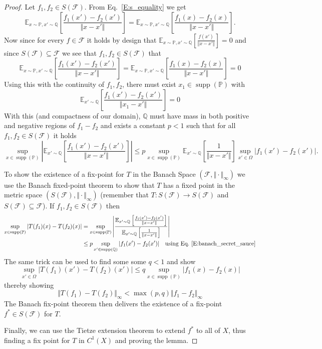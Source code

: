 \documentclass{article}
\DeclareMathOperator{\supp}{supp}
\begin{document}
\begin{proof}
  Let $f_1,f_2\in S(\mathcal F)$. From Eq.\ \ref{E:s_equality} we get
  \[
  \mathbb E_{x\sim\mathbb P,x'\sim\mathbb Q}\left[\frac{f_1(x')-f_2(x')}{\Vert x-x'\Vert}\right]
   =\mathbb E_{x\sim\mathbb P,x'\sim\mathbb Q}\left[\frac{f_1(x)-f_2(x)}{\Vert x-x'\Vert}\right].
  \]
  Now since for every $f\in\mathcal F$ it holds by design that $\mathbb  E_{x\sim\mathbb P,x'\sim\mathbb Q}\left[\frac{f(x')}{\Vert x-x'\Vert}\right]=0$
  and since $S(\mathcal F)\subseteq\mathcal F$ we see that $f_1,f_2\in S(\mathcal F)$ that
  \begin{equation*}
  \mathbb E_{x\sim\mathbb P,x'\sim\mathbb Q}\left[\frac{f_1(x')-f_2(x')}{\Vert x-x'\Vert}\right]
   =\mathbb E_{x\sim\mathbb P,x'\sim\mathbb Q}\left[\frac{f_1(x)-f_2(x)}{\Vert x-x'\Vert}\right]=0
  \end{equation*}
  Using this with the continuity of $f_1,f_2$, there must exist $x_1\in\supp(\mathbb P)$ with
  \begin{equation*}
  \mathbb E_{x'\sim\mathbb Q}\left[\frac{f_1(x')-f_2(x')}{\Vert x_1-x'\Vert}\right]=0
  \end{equation*}
  With this (and compactness of our domain),
  $\mathbb Q$ must have mass in both positive and negative regions of $f_1-f_2$ and exists a constant $p<1$ such that for all
  $f_1,f_2\in S(\mathcal F)$ it holds
  \begin{equation}\label{E:banach_secret_sauce}
   \sup_{x\in\supp(\mathbb P)}\left|\mathbb E_{x'\sim\mathbb Q}\left[\frac{f_1(x')-f_2(x')}{\Vert x-x'\Vert}\right]\right|
   \leq p\sup_{x\in\supp(\mathbb P)}\mathbb E_{x'\sim\mathbb Q}\left[\frac{1}{\Vert x-x'\Vert}\right]\sup_{x'\in\Omega} |f_1(x')-f_2(x')|.
  \end{equation}

  To show the existence of a fix-point for $T$ in the Banach Space $(\mathcal F,\Vert\cdot\Vert_{\infty})$ we use the Banach fixed-point theorem
  to show that $T$ has a fixed point in the metric space $(S(\mathcal F),\Vert\cdot\Vert_{\infty})$ (remember that $T:S(\mathcal F)\to S(\mathcal F)$ and $S(\mathcal F)\subseteq \mathcal F$).
  If $f_1,f_2\in S(\mathcal F)$ then
  \begin{align*}
  \sup_{x\in\supp(\mathbb P)} |T(f_1)(x)-T(f_2)(x)|
  &=\sup_{x\in\supp(\mathbb P)}\left\vert
  \frac{
  \mathbb E_{x'\sim\mathbb Q}\left[\frac{f_1(x')-f_2(x')}{\Vert x-x'\Vert}\right]
  }{
  \mathbb E_{x'\sim\mathbb Q}\left[\frac{1}{\Vert x-x'\Vert}\right]
  }\right\vert\\
  &\leq p\sup_{x'\in\supp(\mathbb Q)}|f_1(x')-f_2(x')|\quad\text{using Eq.\ \ref{E:banach_secret_sauce}}
  \end{align*}
 The same trick can be used to find some some $q<1$ and show
 \[\sup_{x'\in\Omega} |T(f_1)(x')-T(f_2)(x')|\leq q\sup_{x\in\supp(\mathbb P)}|f_1(x)-f_2(x)|\]
 thereby showing
 \[\Vert T(f_1)-T(f_2) \Vert_\infty<\max(p,q) \Vert f_1-f_2 \Vert_\infty\]
 The Banach fix-point theorem then delivers the existence of a fix-point $f^*\in S(\mathcal F)$ for $T$.

 Finally, we can use the Tietze extension theorem to extend $f^*$
 to all of $X$, thus finding a fix point for $T$ in $C^1(X)$ and proving the lemma.
 \end{proof}
\end{document}
